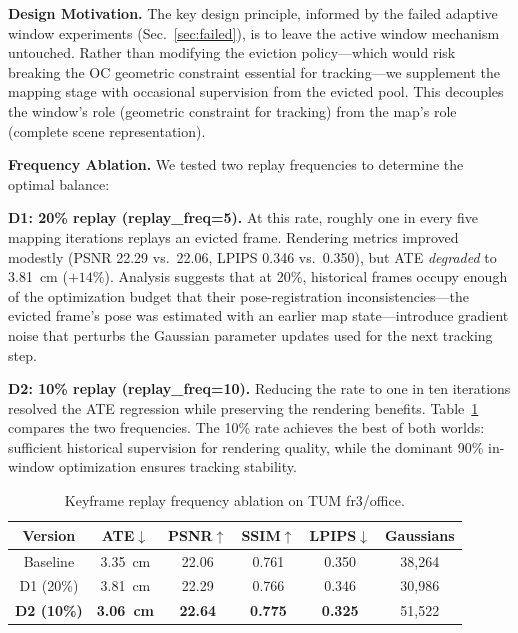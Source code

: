 \documentclass[conference]{IEEEtran}
\begin{document}
\textbf{Design Motivation.}
The key design principle, informed by the failed adaptive window experiments (Sec.~\ref{sec:failed}), is to leave the active window mechanism untouched.
Rather than modifying the eviction policy---which would risk breaking the OC geometric constraint essential for tracking---we supplement the mapping stage with occasional supervision from the evicted pool.
This decouples the window's role (geometric constraint for tracking) from the map's role (complete scene representation).

\textbf{Frequency Ablation.}
We tested two replay frequencies to determine the optimal balance:

\textbf{D1: 20\% replay (replay\_freq=5).}
At this rate, roughly one in every five mapping iterations replays an evicted frame.
Rendering metrics improved modestly (PSNR 22.29 vs.\ 22.06, LPIPS 0.346 vs.\ 0.350), but ATE \textit{degraded} to 3.81~cm ($+14\%$).
Analysis suggests that at 20\%, historical frames occupy enough of the optimization budget that their pose-registration inconsistencies---the evicted frame's pose was estimated with an earlier map state---introduce gradient noise that perturbs the Gaussian parameter updates used for the next tracking step.

\textbf{D2: 10\% replay (replay\_freq=10).}
Reducing the rate to one in ten iterations resolved the ATE regression while preserving the rendering benefits.
Table~\ref{tab:d_ablation} compares the two frequencies.
The 10\% rate achieves the best of both worlds: sufficient historical supervision for rendering quality, while the dominant 90\% in-window optimization ensures tracking stability.

\begin{table}[htbp]
\caption{Keyframe replay frequency ablation on TUM fr3/office.}
\label{tab:d_ablation}
\begin{center}
\footnotesize
\setlength{\tabcolsep}{3pt}
\begin{tabular}{|c|c|c|c|c|c|}
\hline
\textbf{Version} & \textbf{ATE$\downarrow$} & \textbf{PSNR$\uparrow$} & \textbf{SSIM$\uparrow$} & \textbf{LPIPS$\downarrow$} & \textbf{Gaussians} \\
\hline
Baseline & 3.35~cm & 22.06 & 0.761 & 0.350 & 38,264 \\
D1 (20\%) & 3.81~cm & 22.29 & 0.766 & 0.346 & 30,986 \\
\textbf{D2 (10\%)} & \textbf{3.06~cm} & \textbf{22.64} & \textbf{0.775} & \textbf{0.325} & 51,522 \\
\hline
\end{tabular}
\end{center}
\end{table}
\end{document}

